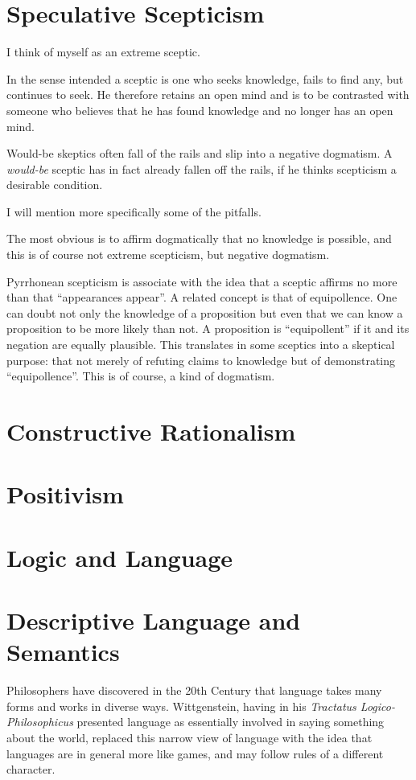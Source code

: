\documentclass{rbjk}
\begin{document}
\begin{article}
\section{Speculative Scepticism}

I think of myself as an extreme sceptic.

In the sense intended a sceptic is one who seeks knowledge, fails to find any, but continues to seek.
He therefore retains an open mind and is to be contrasted with someone who believes that he has found knowledge and no longer has an open mind.

Would-be skeptics often fall of the rails and slip into a negative dogmatism.
A {\it would-be} sceptic has in fact already fallen off the rails, if he thinks scepticism a desirable condition.

I will mention more specifically some of the pitfalls.

The most obvious is to affirm dogmatically that no knowledge is possible, and this is of course not extreme scepticism, but negative dogmatism.

Pyrrhonean scepticism is associate with the idea that a sceptic affirms no more than that ``appearances appear''.
A related concept is that of equipollence.
One can doubt not only the knowledge of a proposition but even that we can know a proposition to be more likely than not.
A proposition is ``equipollent'' if it and its negation are equally plausible.
This translates in some sceptics into a skeptical purpose: that not merely of refuting claims to knowledge but of demonstrating ``equipollence''.
This is of course, a kind of dogmatism.

\section{Constructive Rationalism}

\section{Positivism}

\section{Logic and Language}
\section{Descriptive Language and Semantics}

Philosophers have discovered in the 20th Century that language takes many forms and works in diverse ways.
Wittgenstein, having in his {\it Tractatus Logico-Philosophicus} presented language as essentially involved in saying something about the world, replaced this narrow view of language with the idea that languages are in general more like games, and may follow rules of a different character.


\end{article}
\end{document}
